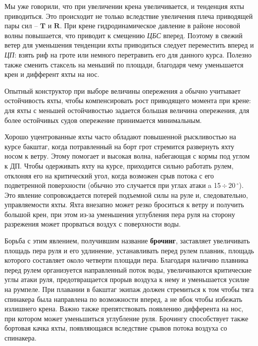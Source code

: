 \documentclass[a4paper, 12pt, twoside, final, book, russian, fittopage, cyremdash]{ncc}
\newcommand{\ve}[1]{\ensuremath{\mathbf{#1}}\xspace}
\newcommand{\gr}{\ensuremath{\,^\circ}\xspace}
\newcommand{\otdo}{\,\ensuremath{\div}\,}
\begin{document}
Мы уже говорили, что при увеличении крена увеличивается, и тенденция яхты приводиться. Это происходит не только вследствие увеличения плеча приводящей пары сил \--- \ve T и \ve R. При крене гидродинамическое давление в районе носовой волны повышается, что приводит к смещению \textit{ЦБС} вперед. Поэтому в свежий ветер для уменьшения тенденции яхты приводиться следует переместить вперед и \textit{ЦП}: взять риф на гроте или немного перетравить его для данного курса. Полезно также сменить стаксель на меньший по площади, благодаря чему уменьшается крен и дифферент яхты на нос.

Опытный конструктор при выборе величины опережения а обычно учитывает остойчивость яхты, чтобы компенсировать рост приводящего момента при крене: для яхты с меньшей остойчивостью задается большая величина опережения, для более остойчивых судов опережение принимается минимальным.

Хорошо уцентрованные яхты часто обладают повышенной рыскливостью на курсе бакштаг, когда потравленный на борт грот стремится развернуть яхту носом к ветру. Этому помогает и высокая волна, набегающая с кормы под углом к ДП. Чтобы одерживать яхту на курсе, приходится сильно работать рулем, отклоняя его на критический угол, когда возможен срыв потока с его подветренной поверхности (обычно это случается при углах атаки a 15\otdo 20\gr). Это явление сопровождается потерей подъемной силы на руле и, следовательно, управляемости яхты. Яхта внезапно может резко броситься к ветру и получить большой крен, при этом из-за уменьшения углубления пера руля на сторону разрежения может прорваться воздух с поверхности воды. 

Борьба с этим явлением, получившим название \textbf{брочинг}, заставляет увеличивать площадь пера руля и его удлинение, устанавливать перед рулем плавник, площадь которого составляет около четверти площади пера. Благодаря наличию плавника перед рулем организуется направленный поток воды, увеличиваются критические углы атаки руля, предотвращается прорыв воздуха к нему и уменьшается усилие на румпеле. При плавании в бакштаг экипаж должен стремиться к том чтобы тяга спинакера была направлена по возможности вперед, а не вбок чтобы избежать излишнего крена. Важно также препятствовать появлению дифферента на нос, при котором может уменьшиться углубление руля. Брочингу способствует также бортовая качка яхты, появляющаяся вследствие срывов потока воздуха со спинакера.
\end{document}

